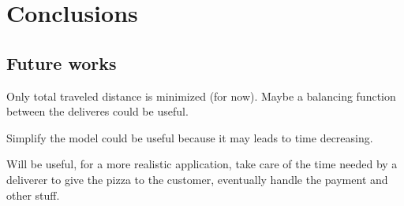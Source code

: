 \documentclass[10pt]{article}
\begin{document}
	\section{Conclusions} 

	\subsection{Future works}
	\label{Future work}
	Only total traveled distance is minimized (for now). Maybe a balancing 
	function between the deliveres could be useful.

	Simplify the model could be useful because it may leads to time decreasing.
	

	Will be useful, for a more realistic application, take care of the time 
	needed by a deliverer to give the pizza to the customer, eventually handle the payment and other stuff. 

	
\end{document}
